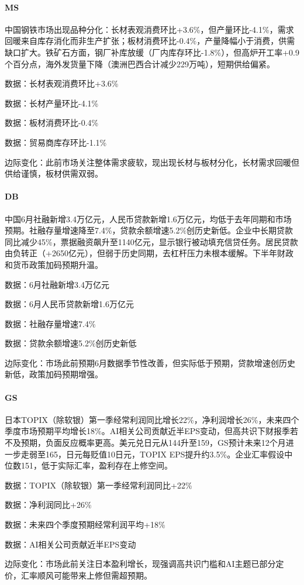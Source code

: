 \documentclass[11pt]{ctexart}
\begin{document}
\paragraph{MS} 中国钢铁市场出现品种分化：长材表观消费环比+3.6\%，但产量环比-4.1\%，需求回暖来自库存消化而非生产扩张；板材消费环比-0.4\%，产量降幅小于消费，供需缺口扩大。铁矿石方面，钢厂补库放缓（厂内库存环比-1.8\%），但高炉开工率+0.9个百分点，海外发货量下降（澳洲巴西合计减少229万吨），短期供给偏紧。
{\small\color{refgray}数据：长材表观消费环比+3.6\%\par}
{\small\color{refgray}数据：长材产量环比-4.1\%\par}
{\small\color{refgray}数据：板材消费环比-0.4\%\par}
{\small\color{refgray}数据：贸易商库存环比-1.1\%\par}
{\small\color{refgray}边际变化：此前市场关注整体需求疲软，现出现长材与板材分化，长材需求回暖但供给谨慎，板材供需双弱。\par}
\paragraph{DB} 中国6月社融新增3.4万亿元，人民币贷款新增1.6万亿元，均低于去年同期和市场预期。社融存量增速降至7.4\%，贷款余额增速5.2\%创历史新低。企业中长期贷款同比减少45\%，票据融资飙升至1140亿元，显示银行被动填充信贷任务。居民贷款由负转正（+2650亿元），但弱于历史同期，去杠杆压力未根本缓解。下半年财政和货币政策加码预期升温。
{\small\color{refgray}数据：6月社融新增3.4万亿元\par}
{\small\color{refgray}数据：6月人民币贷款新增1.6万亿元\par}
{\small\color{refgray}数据：社融存量增速7.4\%\par}
{\small\color{refgray}数据：贷款余额增速5.2\%创历史新低\par}
{\small\color{refgray}边际变化：市场此前预期6月数据季节性改善，但实际低于预期，贷款增速创历史新低，政策加码预期增强。\par}
\paragraph{GS} 日本TOPIX（除软银）第一季经常利润同比增长22\%，净利润增长26\%，未来四个季度市场预期平均增长18\%。AI相关公司贡献近半EPS变动，但高共识下财报季若不及预期，负面反应概率更高。美元兑日元从144升至159，GS预计未来12个月进一步走弱至165，日元每贬值10日元，TOPIX EPS提升约3.5\%。企业汇率假设中位数151，低于实际汇率，盈利存在上修空间。
{\small\color{refgray}数据：TOPIX（除软银）第一季经常利润同比+22\%\par}
{\small\color{refgray}数据：净利润同比+26\%\par}
{\small\color{refgray}数据：未来四个季度预期经常利润平均+18\%\par}
{\small\color{refgray}数据：AI相关公司贡献近半EPS变动\par}
{\small\color{refgray}边际变化：市场此前关注日本盈利增长，现强调高共识门槛和AI主题已部分定价，汇率顺风可能带来上修但需超预期。\par}
\end{document}
